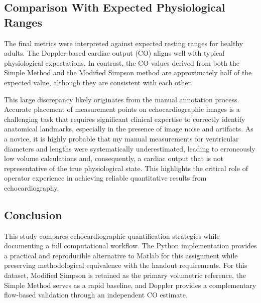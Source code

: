 \subsection{Comparison With Expected Physiological Ranges}
The final metrics were interpreted against expected resting ranges for healthy adults. The Doppler-based cardiac output (CO) aligns well with typical physiological expectations. In contrast, the CO values derived from both the Simple Method and the Modified Simpson method are approximately half of the expected value, although they are consistent with each other.

This large discrepancy likely originates from the manual annotation process. Accurate placement of measurement points on echocardiographic images is a challenging task that requires significant clinical expertise to correctly identify anatomical landmarks, especially in the presence of image noise and artifacts. As a novice, it is highly probable that my manual measurements for ventricular diameters and lengths were systematically underestimated, leading to erroneously low volume calculations and, consequently, a cardiac output that is not representative of the true physiological state. This highlights the critical role of operator experience in achieving reliable quantitative results from echocardiography.

\subsection{Conclusion}
This study compares echocardiographic quantification strategies while documenting a full computational workflow. The Python implementation provides a practical and reproducible alternative to Matlab for this assignment while preserving methodological equivalence with the handout requirements. For this dataset, Modified Simpson is retained as the primary volumetric reference, the Simple Method serves as a rapid baseline, and Doppler provides a complementary flow-based validation through an independent CO estimate.
